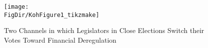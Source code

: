 \begin{figure}[ht]
  \centerline{
    \texttt{[image: \\FigDir/KohFigure1\_tikzmake]}
  }
    \caption{Two Channels in which Legislators in Close Elections Switch their Votes Toward Financial Deregulation}\label{KohFigure1}
\end{figure}